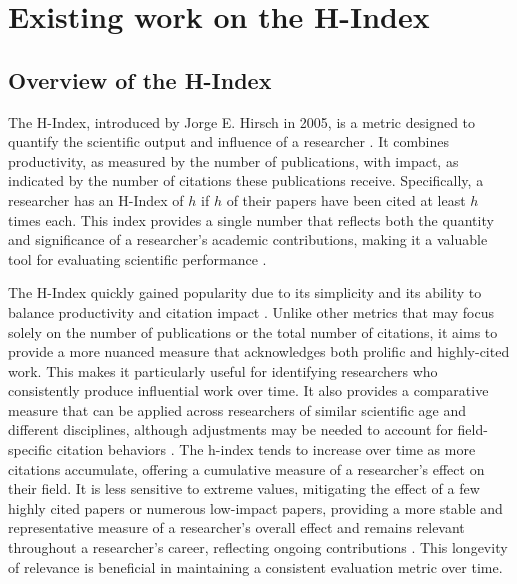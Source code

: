 \chapter{Existing work on the H-Index}
\label{ch:background}

\section{Overview of the H-Index}
The H-Index, introduced by Jorge E. Hirsch in 2005, is a metric designed to
quantify the scientific output and influence of a researcher
\cite{hirsch2005index,hirsch2014meaning,koltun2021h}. It combines productivity,
as measured by the number of publications, with impact, as indicated by the
number of citations these publications receive. Specifically, a researcher has
an H-Index of $h$ if $h$ of their papers have been cited at least $h$ times
each. This index provides a single number that reflects both the quantity and
significance of a researcher’s academic contributions, making it a valuable
tool for evaluating scientific performance
\cite{hirsch2005index,hirsch2014meaning}.

The H-Index quickly gained popularity due to its simplicity and its ability to
balance productivity and citation impact
\cite{hirsch2005index,bornmann2007what,costas2007h,waltman2012inconsistency,hirsch2014meaning,koltun2021h}.
Unlike other metrics that may focus solely on the number of publications or the
total number of citations, it aims to provide a more nuanced measure that
acknowledges both prolific and highly-cited work. This makes it particularly
useful for identifying researchers who consistently produce influential work
over time. It also provides a comparative measure that can be applied across
researchers of similar scientific age and different disciplines, although
adjustments may be needed to account for field-specific citation behaviors
\cite{hirsch2005index,bornmann2007what,costas2007h,egghe2010hirsch}. The
h-index tends to increase over time as more citations accumulate, offering a
cumulative measure of a researcher’s effect on their field. It is less
sensitive to extreme values, mitigating the effect of a few highly cited papers
or numerous low-impact papers, providing a more stable and representative
measure of a researcher's overall effect and remains relevant throughout a
researcher's career, reflecting ongoing contributions
\cite{hirsch2005index,costas2007h,waltman2012inconsistency,egghe2010hirsch}.
This longevity of relevance is beneficial in maintaining a consistent
evaluation metric over time.

